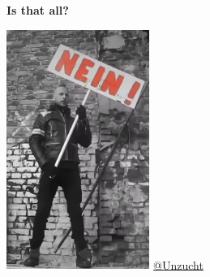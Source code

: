 \documentclass[usenames,dvipsnames, 18pt, compress, aspectratio=169]{beamer}
\newcommand{\trienode}[5] {
    \node[trie-node, below=0.35cm of node#1, xshift=#4] (node#2) {};
    \coordinate[above=0.3cm of node#2.center] (node#2-anchor);
    \node[below=0.0cm of node#2-anchor] (node#2-value) {\footnotesize{#3}};
    \draw[-, btree-line] (node#1) -- (node#2);

    \ifthenelse{ \equal{#5}{} } {}
    {
        \node[below=0.05cm of node#2, color=gray] (node#2-total-value) {\tiny{#5}};
    }
}
\begin{document}




\begin{frame}[fragile]{}
    \frametitle{}

    \vspace{0.3cm}
    \begin{center}
     {
        \textbf{Is that all?}
    }
     {
        \includegraphics[width=0.35\textwidth,center]{nein.png}
        \hspace*{6cm}
        \href{https://www.youtube.com/watch?v=_dRra4786Ww}
             {\color{white}\fontsize{5pt}{0}\selectfont @Unzucht}

    }
    \end{center}
\end{frame}
\end{document}
